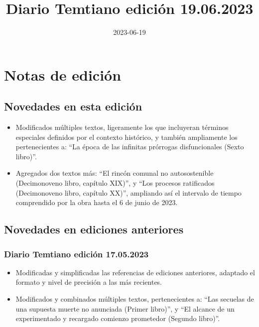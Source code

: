 \documentclass[
]{book}
\title{Diario Temtiano edición 19.06.2023}
\author{}
\date{\vspace{-2.5em}2023-06-19}
\begin{document}
\maketitle

{
\setcounter{tocdepth}{1}
\tableofcontents
}
\hypertarget{notas-de-ediciuxf3n}{%
\chapter*{Notas de edición}\label{notas-de-ediciuxf3n}}

\hypertarget{novedades-en-esta-ediciuxf3n}{%
\section*{Novedades en esta edición}\label{novedades-en-esta-ediciuxf3n}}

\begin{itemize}
\item
  Modificados múltiples textos, ligeramente los que incluyeran términos especiales definidos por el contexto histórico, y también ampliamente los pertenecientes a: ``La época de las infinitas prórrogas disfuncionales (Sexto libro)''.
\item
  Agregados dos textos más: ``El rincón comunal no autosostenible (Decimonoveno libro, capítulo XIX)'', y ``Los procesos ratificados (Decimonoveno libro, capítulo XX)'', ampliando así el intervalo de tiempo comprendido por la obra hasta el 6 de junio de 2023.
\end{itemize}

\hypertarget{novedades-en-ediciones-anteriores}{%
\section*{Novedades en ediciones anteriores}\label{novedades-en-ediciones-anteriores}}

\hypertarget{diario-temtiano-ediciuxf3n-17.05.2023}{%
\subsection*{Diario Temtiano edición 17.05.2023}\label{diario-temtiano-ediciuxf3n-17.05.2023}}

\begin{itemize}
\item
  Modificadas y simplificadas las referencias de ediciones anteriores, adaptado el formato y nivel de precisión a las más recientes.
\item
  Modificados y combinados múltiples textos, pertenecientes a: ``Las secuelas de una supuesta muerte no anunciada (Primer libro)'', y ``El alcance de un experimentado y recargado comienzo prometedor (Segundo libro)''.
\end{itemize}
\end{document}
